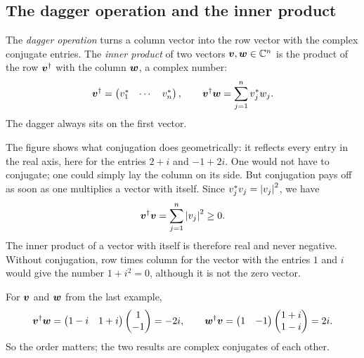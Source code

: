 \subsection{The dagger operation and the inner product}
The \emph{dagger operation} turns a column vector into the row vector with the complex conjugate entries. The \emph{inner product} of two vectors $\boldsymbol{v},\boldsymbol{w}\in\mathbb{C}^n$ is the product of the row $\boldsymbol{v}^{\dagger}$ with the column $\boldsymbol{w}$, a complex number:
\begin{equation}
	\boldsymbol{v}^{\dagger} = \begin{pmatrix} v_1^* & \cdots & v_n^* \end{pmatrix}, \qquad
	\boldsymbol{v}^{\dagger}\boldsymbol{w} = \sum_{j=1}^{n} v_j^* w_j.
\end{equation}
The dagger always sits on the first vector.




The figure shows what conjugation does geometrically: it reflects every entry in the real axis, here for the entries $2+i$ and $-1+2i$. One would not have to conjugate; one could simply lay the column on its side. But conjugation pays off as soon as one multiplies a vector with itself. Since $v_j^* v_j = \left\lvert v_j \right\rvert^2$, we have
\begin{equation}
	\boldsymbol{v}^{\dagger}\boldsymbol{v} = \sum_{j=1}^{n} \left\lvert v_j \right\rvert^2 \geq 0.
\end{equation}
The inner product of a vector with itself is therefore real and never negative. Without conjugation, row times column for the vector with the entries $1$ and $i$ would give the number $1+i^2=0$, although it is not the zero vector.

\begin{example}
	For $\boldsymbol{v}$ and $\boldsymbol{w}$ from the last example,
	\begin{equation}
		\boldsymbol{v}^{\dagger}\boldsymbol{w} = \begin{pmatrix} 1-i & 1+i \end{pmatrix} \begin{pmatrix} 1 \\ -1 \end{pmatrix} = -2i, \qquad
		\boldsymbol{w}^{\dagger}\boldsymbol{v} = \begin{pmatrix} 1 & -1 \end{pmatrix} \begin{pmatrix} 1+i \\ 1-i \end{pmatrix} = 2i.
	\end{equation}
	So the order matters; the two results are complex conjugates of each other.
\end{example}

